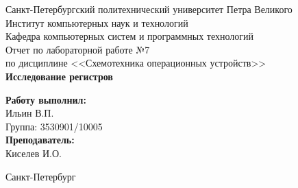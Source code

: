 \begin{titlepage}
    \begin{center}
        \large Санкт-Петербургский политехнический университет Петра Великого\\
        \large Институт компьютерных наук и технологий \\
        \large Кафедра компьютерных систем и программных технологий\\[6cm]


        \huge Отчет по лабораторной работе №7\\[0.5cm]
        \large по дисциплине <<Схемотехника операционных устройств>>\\[0.1cm]
        \large\textbf{Исследование регистров}\\[5cm]
    \end{center}


    \begin{flushright}
        \begin{minipage}{0.25\textwidth}
            \begin{flushleft}

                \large\textbf{Работу выполнил:}\\
                \large Ильин В.П.\\
                \large {Группа:} 3530901/10005\\

                \large \textbf{Преподаватель:}\\
                \large Киселев И.О.

            \end{flushleft}
        \end{minipage}
    \end{flushright}

    \vfill

    \begin{center}
        \large Санкт-Петербург\\
        \large \the\year
    \end{center}
\end{titlepage}

\vfill
\newpage